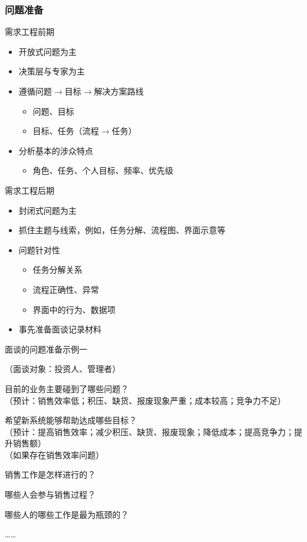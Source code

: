 \subsubsection{问题准备}
\vspace{-0.8em}
\begin{multicols}{2}
\columnseprule=0.8pt
需求工程前期
\begin{itemize}
    \item 开放式问题为主
    \item 决策层与专家为主
    \item 遵循问题$\rightarrow$目标$\rightarrow$解决方案路线
    \begin{itemize}
        \item 问题、目标
        \item 目标、任务（流程$\rightarrow$任务）
    \end{itemize}
    \item 分析基本的涉众特点
    \begin{itemize}
        \item 角色、任务、个人目标、频率、优先级
    \end{itemize}
\end{itemize}

需求工程后期
\begin{itemize}
    \item 封闭式问题为主
    \item 抓住主题与线索，例如，任务分解、流程图、界面示意等
    \item 问题针对性
    \begin{itemize}
        \item 任务分解关系
        \item 流程正确性、异常
        \item 界面中的行为、数据项
    \end{itemize}
    \item 事先准备面谈记录材料
\end{itemize}
\end{multicols}
\vspace{-1em}

面谈的问题准备示例一

{\kaishu
（面谈对象：投资人、管理者）
\vspace{-0.25em}
\begin{compactenum}[1.]
    \item 目前的业务主要碰到了哪些问题？\\
    （预计：销售效率低；积压、缺货、报废现象严重；成本较高；竞争力不足）
    \item 希望新系统能够帮助达成哪些目标？\\
    （预计：提高销售效率；减少积压、缺货、报废现象；降低成本；提高竞争力；提升销售额）\\
    （如果存在销售效率问题）
    \item 销售工作是怎样进行的？
    \item 哪些人会参与销售过程？
    \item 哪些人的哪些工作是最为瓶颈的？
\end{compactenum}
\vspace{-0.5em}
……}

